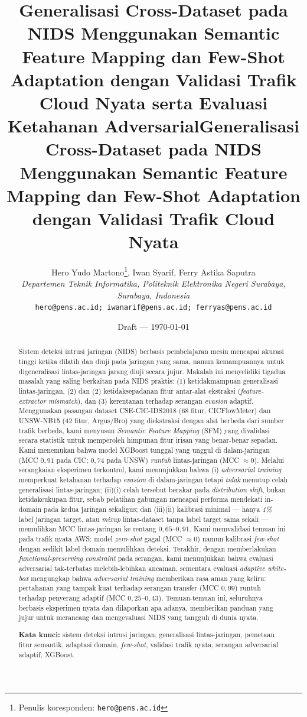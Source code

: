 \documentclass[11pt,a4paper]{article}
\title{\textbf{Generalisasi Cross-Dataset pada NIDS Menggunakan Semantic
  Feature Mapping dan Few-Shot Adaptation dengan Validasi Trafik Cloud Nyata
  serta Evaluasi Ketahanan Adversarial}}
\title{\textbf{Generalisasi Cross-Dataset pada NIDS Menggunakan Semantic
  Feature Mapping dan Few-Shot Adaptation dengan Validasi Trafik Cloud Nyata}}
\author{Hero Yudo Martono\thanks{Penulis koresponden: \texttt{hero@pens.ac.id}},
\quad Iwan Syarif, \quad Ferry Astika Saputra \\[0.3em]
\textit{Departemen Teknik Informatika, Politeknik Elektronika Negeri Surabaya,
Surabaya, Indonesia} \\
\texttt{hero@pens.ac.id; iwanarif@pens.ac.id; ferryas@pens.ac.id}}
\date{Draft --- \today}
\begin{document}
\maketitle

\begin{abstract}
Sistem deteksi intrusi jaringan (NIDS) berbasis pembelajaran mesin mencapai
akurasi tinggi ketika dilatih dan diuji pada jaringan yang sama, namun
kemampuannya untuk digeneralisasi lintas-jaringan jarang diuji secara jujur.
Makalah ini menyelidiki \ifadversarial tiga\else dua\fi{} masalah yang saling berkaitan pada NIDS praktis:
(1) ketidakmampuan generalisasi lintas-jaringan\ifadversarial, (2)\else{} dan (2)\fi{} ketidaksepadanan fitur
antar-alat ekstraksi (\emph{feature-extractor mismatch})\ifadversarial, dan (3) kerentanan
terhadap serangan \emph{evasion} adaptif\fi. Menggunakan pasangan dataset
CSE-CIC-IDS2018 (68 fitur, CICFlowMeter) dan UNSW-NB15 (42 fitur, Argus/Bro)
yang diekstraksi dengan alat berbeda dari sumber trafik berbeda, kami menyusun
\emph{Semantic Feature Mapping} (SFM) yang divalidasi secara statistik untuk
memperoleh himpunan fitur irisan yang benar-benar sepadan. Kami menemukan bahwa
model XGBoost tunggal yang unggul di dalam-jaringan (MCC $0{,}91$ pada CIC;
$0{,}74$ pada UNSW) \emph{runtuh} lintas-jaringan (MCC $\approx 0$). Melalui
serangkaian eksperimen terkontrol, kami menunjukkan bahwa
\ifadversarial (i) \emph{adversarial
training} memperkuat ketahanan terhadap \emph{evasion} di dalam-jaringan tetapi
\emph{tidak} menutup celah generalisasi lintas-jaringan; (ii)\else (i)\fi{} celah tersebut
berakar pada \emph{distribution shift}, bukan ketidakcukupan fitur, sebab
pelatihan gabungan mencapai performa mendekati in-domain pada kedua jaringan
sekaligus; dan \ifadversarial (iii)\else (ii)\fi{} kalibrasi minimal --- hanya \emph{1\%} label jaringan
target, atau \emph{mixup} lintas-dataset tanpa label target sama sekali ---
memulihkan MCC lintas-jaringan ke rentang $0{,}65$--$0{,}91$. Kami memvalidasi
temuan ini pada trafik nyata AWS: model \emph{zero-shot} gagal (MCC $\approx 0$)
namun kalibrasi \emph{few-shot} dengan sedikit label domain memulihkan deteksi.
\ifadversarial Terakhir, dengan
memberlakukan \emph{functional-preserving constraint} pada serangan, kami
menunjukkan bahwa evaluasi adversarial tak-terbatas melebih-lebihkan ancaman,
sementara evaluasi \emph{adaptive white-box} mengungkap bahwa \emph{adversarial
training} memberikan rasa aman yang keliru: pertahanan yang tampak kuat terhadap
serangan transfer (MCC $0{,}99$) runtuh terhadap penyerang adaptif
(MCC $0{,}25$--$0{,}43$). \fi Temuan-temuan ini, seluruhnya berbasis eksperimen
nyata dan dilaporkan apa adanya, memberikan panduan yang jujur untuk merancang
dan mengevaluasi NIDS yang tangguh di dunia nyata.

\vspace{0.5em}
\noindent\textbf{Kata kunci:} sistem deteksi intrusi jaringan, generalisasi
lintas-jaringan, pemetaan fitur semantik, adaptasi domain, \emph{few-shot},
validasi trafik nyata\ifadversarial, serangan adversarial adaptif\fi, XGBoost.
\end{abstract}
\end{document}
